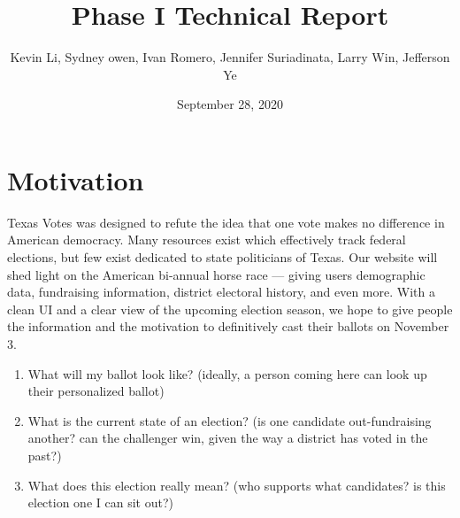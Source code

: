\documentclass[11t]{article}
\title{Phase I Technical Report}
\author{Kevin Li, Sydney owen, Ivan Romero, Jennifer Suriadinata, Larry Win, Jefferson Ye}
\date{September 28, 2020}
\begin{document}
\begin{titlepage}
    \maketitle
\end{titlepage}

\section{Motivation}
Texas Votes was designed to refute the idea that one vote makes no difference in American democracy. Many resources exist which effectively track federal elections, but few exist dedicated to state politicians of Texas. Our website will shed light on the American bi-annual horse race — giving users demographic data, fundraising information, district electoral history, and even more. With a clean UI and a clear view of the upcoming election season, we hope to give people the information and the motivation to definitively cast their ballots on November 3.
\begin{enumerate}
    \item What will my ballot look like? (ideally, a person coming here can look up their personalized ballot)
    \item What is the current state of an election? (is one candidate out-fundraising another? can the challenger win, given the way a district has voted in the past?)
    \item What does this election really mean? (who supports what candidates? is this election one I can sit out?)
\end{enumerate}
\end{document}
